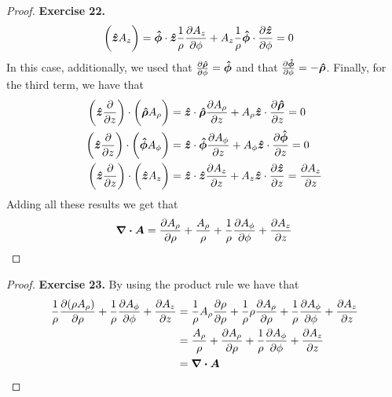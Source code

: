 \documentclass[11pt]{article}
\newcommand{\hatz}{\bm{\hat{z}}}
\newcommand{\hatrho}{\bm{\hat{\rho}}}
\newcommand{\hatphi}{\bm{\hat{\phi}}}
\theoremstyle{definition}
\begin{document}
\begin{proof}{\textbf{Exercise 22.}}
\begin{align*}
        \bigg(\hatz A_z\bigg)
        &= \hatphi \cdot \hatz \frac{1}{\rho} \partialderivative{A_z}{\phi}
        + A_z\frac{1}{\rho} \hatphi \cdot \partialderivative{\hatz}{\phi}
        = 0
    \end{align*}
    In this case, additionally, we used that
    $\partialderivative{\hatrho}{\phi} = \hatphi$ and that
    $\partialderivative{\hatphi}{\phi} = -\hatrho$.
    Finally, for the third term, we have that
    \begin{align*}
        \bigg(\hatz \partialderivative{}{z}\bigg)\cdot
        \bigg(\hatrho A_\rho\bigg)
        &= \hatz \cdot \hatrho \partialderivative{A_\rho}{z}
        + A_\rho \hatz \cdot \partialderivative{\hatrho}{z}
        = 0\\
        \bigg(\hatz \partialderivative{}{z}\bigg)\cdot
        \bigg(\hatphi A_\phi\bigg)
        &= \hatz \cdot \hatphi \partialderivative{A_\phi}{z}
        + A_\phi \hatz \cdot \partialderivative{\hatphi}{z}
        = 0\\
        \bigg(\hatz \partialderivative{}{z}\bigg)\cdot
        \bigg(\hatz A_z\bigg)
        &= \hatz \cdot \hatz \partialderivative{A_z}{z}
        + A_z \hatz \cdot \partialderivative{\hatz}{z}
        = \partialderivative{A_z}{z}
    \end{align*}
    Adding all these results we get that
    \begin{align*}
        \divergence{\bm{A}} = \partialderivative{A_\rho}{\rho}
        + \frac{A_\rho}{\rho}
        + \frac{1}{\rho} \partialderivative{A_\phi}{\phi}
        + \partialderivative{A_z}{z}
    \end{align*}
\end{proof}
\cleardoublepage
\begin{proof}{\textbf{Exercise 23.}}
    By using the product rule we have that
    \begin{align*}
        \frac{1}{\rho}\partialderivative{(\rho A_\rho)}{\rho}
        + \frac{1}{\rho} \partialderivative{A_\phi}{\phi}
        + \partialderivative{A_z}{z}
        &= 
        \frac{1}{\rho}A_\rho\partialderivative{\rho}{\rho}
        + \frac{1}{\rho}\rho\partialderivative{A_\rho}{\rho}
        + \frac{1}{\rho} \partialderivative{A_\phi}{\phi}
        + \partialderivative{A_z}{z}\\
        &= 
        \frac{A_\rho}{\rho}
        + \partialderivative{A_\rho}{\rho}
        + \frac{1}{\rho} \partialderivative{A_\phi}{\phi}
        + \partialderivative{A_z}{z}\\
        &= \divergence{\bm{A}}
    \end{align*}
\end{proof}
\end{document}

